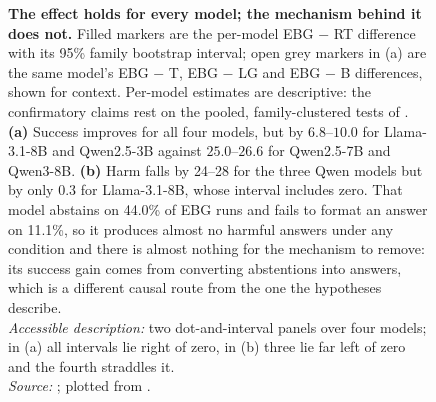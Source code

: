 \begin{figure}[t]
\vspace{-1mm}
\caption[Per-model effects]{%
\textbf{The effect holds for every model; the mechanism behind it does not.} Filled markers are the per-model
EBG $-$ RT difference with its 95\% family bootstrap interval; open grey markers in (a) are the same model's
EBG $-$ T, EBG $-$ LG and EBG $-$ B differences, shown for context. Per-model estimates are descriptive: the
confirmatory claims rest on the pooled, family-clustered tests of . \textbf{(a)} Success improves
for all four models, but by $6.8$--$10.0$\pp{} for Llama-3.1-8B and Qwen2.5-3B against $25.0$--$26.6$\pp{} for
Qwen2.5-7B and Qwen3-8B. \textbf{(b)} Harm falls by 24--28\pp{} for the three Qwen models but by only
$0.3$\pp{} for Llama-3.1-8B, whose interval includes zero. That model abstains on 44.0\% of EBG runs and fails to
format an answer on 11.1\%, so it produces almost no harmful answers under any condition and there is almost
nothing for the mechanism to remove: its success gain comes from converting abstentions into answers, which is a
different causal route from the one the hypotheses describe.\\
\emph{Accessible description:} two dot-and-interval panels over four models; in (a) all intervals lie right of
zero, in (b) three lie far left of zero and the fourth straddles it.\\
\emph{Source:} ; plotted from
.}
\label{fig:permodel}
\end{figure}
